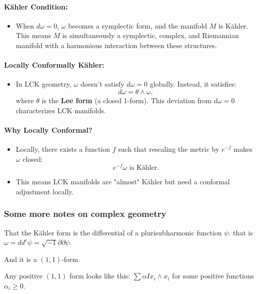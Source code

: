 \paragraph{Kähler Condition:}
\begin{itemize}
    \item When \(d\omega = 0\), \(\omega\) becomes a symplectic form, and the manifold \(M\) is Kähler. This means \(M\) is simultaneously a symplectic, complex, and Riemannian manifold with a harmonious interaction between these structures.
\end{itemize}

\paragraph{Locally Conformally Kähler:}
\begin{itemize}
    \item In LCK geometry, \(\omega\) doesn’t satisfy \(d\omega = 0\) globally. Instead, it satisfies:
    \[
    d\omega = \theta \wedge \omega,
    \]
    where \(\theta\) is the \textbf{Lee form} (a closed 1-form). This deviation from \(d\omega = 0\) characterizes LCK manifolds.
\end{itemize}

\paragraph{Why Locally Conformal?}
\begin{itemize}
    \item Locally, there exists a function \(f\) such that rescaling the metric by \(e^{-f}\) makes \(\omega\) closed:
    \[
    e^{-f}\omega \text{ is Kähler.}
    \]
    \item This means LCK manifolds are "almost" Kähler but need a conformal adjustment locally.
\end{itemize}

\subsubsection{Some more notes on complex geometry}

That the Kähler form is the differential of a plurisubharmonic function \(\psi\). that is \(\omega=d d^c \psi=\sqrt{-1} \partial \partial \psi\).

And it is a \((1,1)\)-form.

Any positive \((1,1)\) form looks like this:  \(\sum \alpha I x_i \wedge x_i\) for some positive functions \(\alpha_i \geq 0\).


